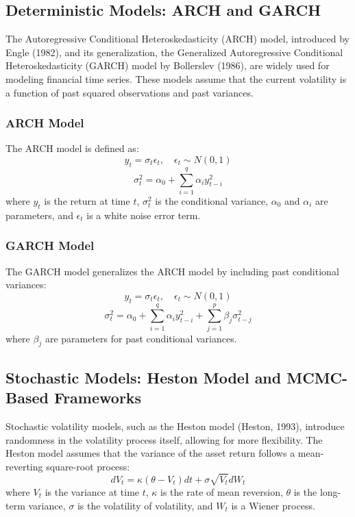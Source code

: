 \documentclass[letterpaper, 11pt]{article}
\begin{document}
\subsection{Deterministic Models: ARCH and GARCH}
The Autoregressive Conditional Heteroskedasticity (ARCH) model, introduced by Engle (1982), and its generalization, the Generalized Autoregressive Conditional Heteroskedasticity (GARCH) model by Bollerslev (1986), are widely used for modeling financial time series. These models assume that the current volatility is a function of past squared observations and past variances.

\subsubsection{ARCH Model}
The ARCH model is defined as:
\begin{equation}
y_t = \sigma_t \epsilon_t, \quad \epsilon_t \sim N(0,1)
\end{equation}
\begin{equation}
\sigma_t^2 = \alpha_0 + \sum_{i=1}^q \alpha_i y_{t-i}^2
\end{equation}
where \( y_t \) is the return at time \( t \), \( \sigma_t^2 \) is the conditional variance, \( \alpha_0 \) and \( \alpha_i \) are parameters, and \( \epsilon_t \) is a white noise error term.

\subsubsection{GARCH Model}
The GARCH model generalizes the ARCH model by including past conditional variances:
\begin{equation}
y_t = \sigma_t \epsilon_t, \quad \epsilon_t \sim N(0,1)
\end{equation}
\begin{equation}
\sigma_t^2 = \alpha_0 + \sum_{i=1}^q \alpha_i y_{t-i}^2 + \sum_{j=1}^p \beta_j \sigma_{t-j}^2
\end{equation}
where \( \beta_j \) are parameters for past conditional variances.

\subsection{Stochastic Models: Heston Model and MCMC-Based Frameworks}
Stochastic volatility models, such as the Heston model (Heston, 1993), introduce randomness in the volatility process itself, allowing for more flexibility. The Heston model assumes that the variance of the asset return follows a mean-reverting square-root process:
\begin{equation}
dV_t = \kappa (\theta - V_t) dt + \sigma \sqrt{V_t} dW_t
\end{equation}
where \( V_t \) is the variance at time \( t \), \( \kappa \) is the rate of mean reversion, \( \theta \) is the long-term variance, \( \sigma \) is the volatility of volatility, and \( W_t \) is a Wiener process.
\end{document}
